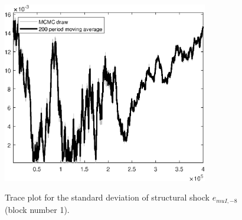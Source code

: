 \begin{figure}[H]
\centering
  \includegraphics[width=0.8\textwidth]{BRS_sectoral/graphs/TracePlot_SE_e_muI_news_8_blck_1}\\
    \caption{Trace plot for the standard deviation of structural shock ${e_{muI,-8}}$ (block number 1).}
\end{figure}
